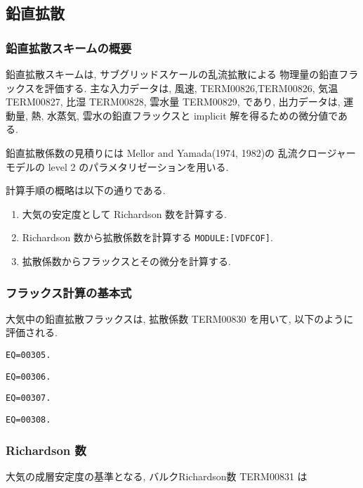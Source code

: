 ﻿
\subsection{鉛直拡散}

\subsubsection{鉛直拡散スキームの概要}

鉛直拡散スキームは,
サブグリッドスケールの乱流拡散による
物理量の鉛直フラックスを評価する.
主な入力データは, 風速, TERM00826,TERM00826, 気温 TERM00827, 比湿 TERM00828, 雲水量 TERM00829, であり,
出力データは, 運動量, 熱, 水蒸気, 雲水の鉛直フラックスと
implicit 解を得るための微分値である.

鉛直拡散係数の見積りには
Mellor and Yamada(1974, 1982)の
乱流クロージャーモデルの
level 2 のパラメタリゼーションを用いる.

計算手順の概略は以下の通りである.
\begin{enumerate}
\item 大気の安定度として
      Richardson 数を計算する.
\item Richardson 数から拡散係数を計算する \texttt{MODULE:[VDFCOF]}.
\item 拡散係数からフラックスとその微分を計算する.
\end{enumerate}

\subsubsection{フラックス計算の基本式}

大気中の鉛直拡散フラックスは, 
拡散係数 TERM00830 を用いて, 以下のように評価される.

\begin{verbatim}
EQ=00305.
\end{verbatim}
\begin{verbatim}
EQ=00306.
\end{verbatim}
\begin{verbatim}
EQ=00307.
\end{verbatim}
\begin{verbatim}
EQ=00308.
\end{verbatim}

\subsubsection{Richardson 数}

大気の成層安定度の基準となる,
バルクRichardson数 TERM00831 は

